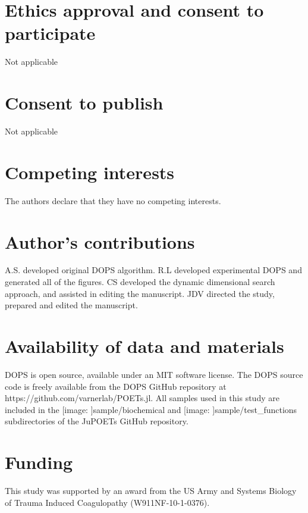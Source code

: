 \documentclass{bmcart}
\def\texttt{[image: ]}
\begin{document}
\begin{backmatter}

\section*{Ethics approval and consent to participate}
Not applicable

\section*{Consent to publish}
Not applicable

\section*{Competing interests}
  The authors declare that they have no competing interests.

\section*{Author's contributions}
    A.S. developed original DOPS algorithm. R.L developed experimental DOPS and generated all of the figures.
    CS developed the dynamic dimensional search approach, and assisted in editing the manuscript.
    JDV directed the study, prepared and edited the manuscript.

\section*{Availability of data and materials}
DOPS is open source, available under an MIT software license.
The DOPS source code is freely available from the DOPS GitHub repository at https://github.com/varnerlab/POETs.jl.
All samples used in this study are included in the \texttt{sample/biochemical} and \texttt{sample/test\_functions} subdirectories of the JuPOETs GitHub repository.


\section*{Funding}
This study was supported by an award from the US Army and Systems Biology of Trauma Induced Coagulopathy (W911NF-10-1-0376).



\end{backmatter}
\end{document}
